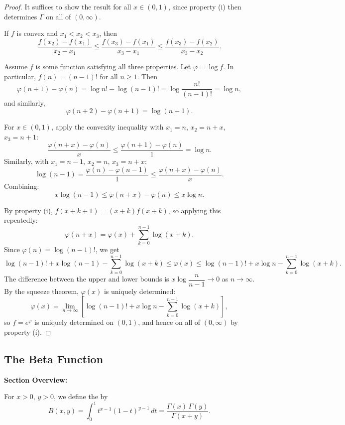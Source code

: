 \documentclass[../master/master.tex]{subfiles}
\begin{document}
\begin{proof}
It suffices to show the result for all $x \in (0,1)$, since property (i) then determines $\Gamma$ on all of $(0,\infty)$.

If $f$ is convex and $x_1 < x_2 < x_3$, then
\[
\frac{f(x_2) - f(x_1)}{x_2 - x_1} \leq \frac{f(x_3) - f(x_1)}{x_3 - x_1} \leq \frac{f(x_3) - f(x_2)}{x_3 - x_2}.
\]

Assume $f$ is some function satisfying all three properties. Let $\varphi = \log f$. In particular, $f(n) = (n-1)!$ for all $n \geq 1$. Then
\[
\varphi(n+1) - \varphi(n) = \log n! - \log (n-1)! = \log \frac{n!}{(n-1)!} = \log n,
\]
and similarly,
\[
\varphi(n+2) - \varphi(n+1) = \log(n+1).
\]

For $x \in (0,1)$, apply the convexity inequality with $x_1 = n$, $x_2 = n+x$, $x_3 = n+1$:
\[
\frac{\varphi(n+x) - \varphi(n)}{x} \leq \frac{\varphi(n+1) - \varphi(n)}{1} = \log n.
\]
Similarly, with $x_1 = n-1$, $x_2 = n$, $x_3 = n+x$:
\[
\log(n-1) = \frac{\varphi(n) - \varphi(n-1)}{1} \leq \frac{\varphi(n+x) - \varphi(n)}{x}.
\]
Combining:
\[
x\log(n-1) \leq \varphi(n+x) - \varphi(n) \leq x\log n.
\]

By property (i), $f(x+k+1) = (x+k)f(x+k)$, so applying this repeatedly:
\[
\varphi(n+x) = \varphi(x) + \sum_{k=0}^{n-1} \log(x+k).
\]
Since $\varphi(n) = \log(n-1)!$, we get
\[
\log(n-1)! + x\log(n-1) - \sum_{k=0}^{n-1}\log(x+k) \leq \varphi(x) \leq \log(n-1)! + x\log n - \sum_{k=0}^{n-1}\log(x+k).
\]
The difference between the upper and lower bounds is $x\log\dfrac{n}{n-1} \to 0$ as $n \to \infty$. By the squeeze theorem, $\varphi(x)$ is uniquely determined:
\[
\varphi(x) = \lim_{n \to \infty} \left[\log(n-1)! + x\log n - \sum_{k=0}^{n-1}\log(x+k)\right],
\]
so $f = e^{\varphi}$ is uniquely determined on $(0,1)$, and hence on all of $(0,\infty)$ by property (i).
\end{proof}

\subsection{The Beta Function}

\begin{summarybox}
\textbf{Section Overview:}
\end{summarybox}

\begin{definition}
For $x > 0$, $y > 0$, we define the  by
\[
B(x, y) = \int_0^1 t^{x-1}(1-t)^{y-1}\,dt = \frac{\Gamma(x)\,\Gamma(y)}{\Gamma(x+y)}.
\]
\end{definition}
\end{document}
